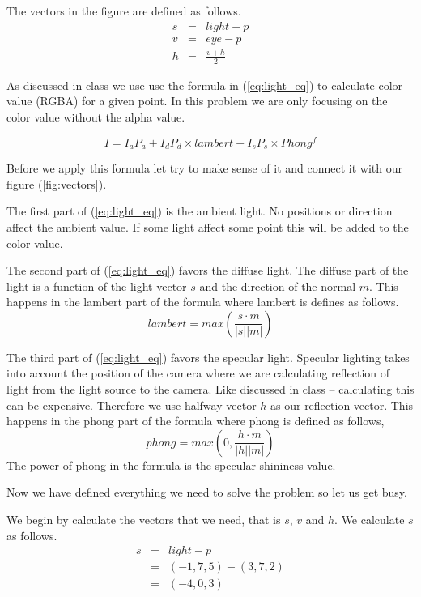 \documentclass[12pt]{article}
\begin{document}
The vectors in the figure are defined as follows.
\begin{eqnarray*}
    s &=& light - p\\
    v &=& eye -p\\
    h &=& \frac{v+h}{2}
\end{eqnarray*}

As discussed in class we use use the formula in (\ref{eq:light_eq}) to
calculate color value (RGBA) for a given point. In this problem we
are only focusing on the color value without the alpha value.

\begin{equation}
    I = I_a P_a + I_d P_d \times lambert + I_s P_s \times Phong^f
    \label{eq:light_eq}
\end{equation}

Before we apply this formula let try to make sense of it and connect it
with our figure (\ref{fig:vectors}).

The first part of (\ref{eq:light_eq}) is the ambient light. No positions or
direction affect the ambient value. If some light affect some point this will
be added to the color value.

The second part of (\ref{eq:light_eq}) favors the diffuse light.
The diffuse part of the light is a function of the light-vector $s$ and the
direction of the normal $m$. This happens in the lambert part of the formula
where lambert is defines as follows.
\begin{equation*}
    lambert = max\left( \frac{s \cdot m}{|s||m|} \right) 
    \label{eq:lambert}
\end{equation*}

The third part of (\ref{eq:light_eq}) favors the specular light. Specular
lighting takes into account the position of the camera where we are calculating
reflection of light from the light source to the camera.  Like discussed in
class -- calculating this can be expensive. Therefore we use halfway vector $h$
as our reflection vector. This happens in the phong part of the formula where
phong is defined as follows,
\begin{equation*}
    phong = max\left( 0, \frac{h \cdot m}{|h||m|} \right)
    \label{eq:phong}
\end{equation*}
The power of phong in the formula is the specular shininess value.

Now we have defined everything we need to solve the problem so let us get busy.

We begin by calculate the vectors that we need, that is $s$, $v$ and $h$. We
calculate $s$ as follows.
\begin{eqnarray*}
    s &=& light - p\\
    &=& (-1,7,5) - (3,7,2)\\
    &=& (-4, 0,3)
\end{eqnarray*}
\end{document}
